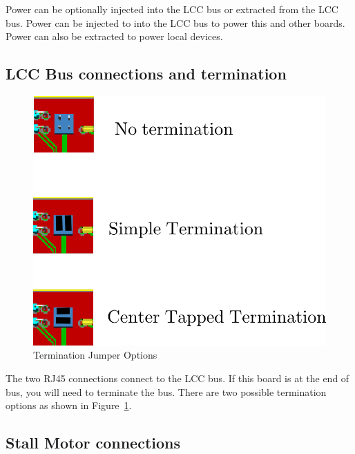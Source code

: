 Power can be optionally injected into the LCC bus or extracted from the LCC 
bus. Power can be injected to into the LCC bus to power this and other boards. 
Power can also be extracted to power local devices.

\subsection{LCC Bus connections and termination}

\begin{figure}[hbpt]\begin{centering}%
\includegraphics{ESP32-PWMHalfSidingTermination.png}
\caption{Termination Jumper Options}
\label{fig:ESP32-PWMHalfSidingTermination}
\end{centering}\end{figure}
The two RJ45 connections connect to the LCC bus.  If this board is at the end 
of bus, you will need to terminate the bus.  There are two possible 
termination options as shown in 
Figure~\ref{fig:ESP32-PWMHalfSidingTermination}.

\subsection{Stall Motor connections}


